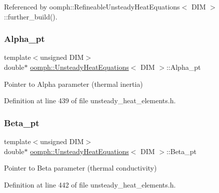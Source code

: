 Referenced by oomph\+::\+Refineable\+Unsteady\+Heat\+Equations$<$ D\+I\+M $>$\+::further\+\_\+build().

\mbox{\label{classoomph_1_1UnsteadyHeatEquations_aeb5d0e576ea07b635fc0c6c74a3f3130}} 
\subsubsection{\texorpdfstring{Alpha\+\_\+pt}{Alpha\_pt}}
{\footnotesize\ttfamily template$<$unsigned D\+IM$>$ \\
double$\ast$ \hyperlink{classoomph_1_1UnsteadyHeatEquations}{oomph\+::\+Unsteady\+Heat\+Equations}$<$ D\+IM $>$\+::Alpha\+\_\+pt\hspace{0.3cm}{\ttfamily [protected]}}



Pointer to Alpha parameter (thermal inertia) 



Definition at line 439 of file unsteady\+\_\+heat\+\_\+elements.\+h.

\mbox{\label{classoomph_1_1UnsteadyHeatEquations_ad1b36eb20c42a8ce7e3eba9d2b182bb8}} 
\subsubsection{\texorpdfstring{Beta\+\_\+pt}{Beta\_pt}}
{\footnotesize\ttfamily template$<$unsigned D\+IM$>$ \\
double$\ast$ \hyperlink{classoomph_1_1UnsteadyHeatEquations}{oomph\+::\+Unsteady\+Heat\+Equations}$<$ D\+IM $>$\+::Beta\+\_\+pt\hspace{0.3cm}{\ttfamily [protected]}}



Pointer to Beta parameter (thermal conductivity) 



Definition at line 442 of file unsteady\+\_\+heat\+\_\+elements.\+h.

